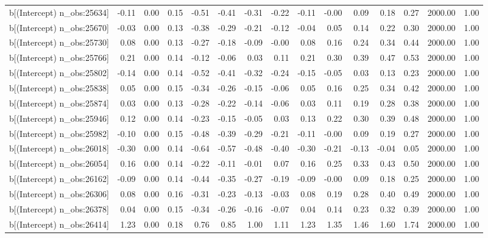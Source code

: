 \begin{table}[ht]
\begin{tabular}{rrrrrrrrrrrrrrr}
  b[(Intercept) n\_obs:25634] & -0.11 & 0.00 & 0.15 & -0.51 & -0.41 & -0.31 & -0.22 & -0.11 & -0.00 & 0.09 & 0.18 & 0.27 & 2000.00 & 1.00 \\ 
  b[(Intercept) n\_obs:25670] & -0.03 & 0.00 & 0.13 & -0.38 & -0.29 & -0.21 & -0.12 & -0.04 & 0.05 & 0.14 & 0.22 & 0.30 & 2000.00 & 1.00 \\ 
  b[(Intercept) n\_obs:25730] & 0.08 & 0.00 & 0.13 & -0.27 & -0.18 & -0.09 & -0.00 & 0.08 & 0.16 & 0.24 & 0.34 & 0.44 & 2000.00 & 1.00 \\ 
  b[(Intercept) n\_obs:25766] & 0.21 & 0.00 & 0.14 & -0.12 & -0.06 & 0.03 & 0.11 & 0.21 & 0.30 & 0.39 & 0.47 & 0.53 & 2000.00 & 1.00 \\ 
  b[(Intercept) n\_obs:25802] & -0.14 & 0.00 & 0.14 & -0.52 & -0.41 & -0.32 & -0.24 & -0.15 & -0.05 & 0.03 & 0.13 & 0.23 & 2000.00 & 1.00 \\ 
  b[(Intercept) n\_obs:25838] & 0.05 & 0.00 & 0.15 & -0.34 & -0.26 & -0.15 & -0.06 & 0.05 & 0.16 & 0.25 & 0.34 & 0.42 & 2000.00 & 1.00 \\ 
  b[(Intercept) n\_obs:25874] & 0.03 & 0.00 & 0.13 & -0.28 & -0.22 & -0.14 & -0.06 & 0.03 & 0.11 & 0.19 & 0.28 & 0.38 & 2000.00 & 1.00 \\ 
  b[(Intercept) n\_obs:25946] & 0.12 & 0.00 & 0.14 & -0.23 & -0.15 & -0.05 & 0.03 & 0.13 & 0.22 & 0.30 & 0.39 & 0.48 & 2000.00 & 1.00 \\ 
  b[(Intercept) n\_obs:25982] & -0.10 & 0.00 & 0.15 & -0.48 & -0.39 & -0.29 & -0.21 & -0.11 & -0.00 & 0.09 & 0.19 & 0.27 & 2000.00 & 1.00 \\ 
  b[(Intercept) n\_obs:26018] & -0.30 & 0.00 & 0.14 & -0.64 & -0.57 & -0.48 & -0.40 & -0.30 & -0.21 & -0.13 & -0.04 & 0.05 & 2000.00 & 1.00 \\ 
  b[(Intercept) n\_obs:26054] & 0.16 & 0.00 & 0.14 & -0.22 & -0.11 & -0.01 & 0.07 & 0.16 & 0.25 & 0.33 & 0.43 & 0.50 & 2000.00 & 1.00 \\ 
  b[(Intercept) n\_obs:26162] & -0.09 & 0.00 & 0.14 & -0.44 & -0.35 & -0.27 & -0.19 & -0.09 & -0.00 & 0.09 & 0.18 & 0.25 & 2000.00 & 1.00 \\ 
  b[(Intercept) n\_obs:26306] & 0.08 & 0.00 & 0.16 & -0.31 & -0.23 & -0.13 & -0.03 & 0.08 & 0.19 & 0.28 & 0.40 & 0.49 & 2000.00 & 1.00 \\ 
  b[(Intercept) n\_obs:26378] & 0.04 & 0.00 & 0.15 & -0.34 & -0.26 & -0.16 & -0.07 & 0.04 & 0.14 & 0.23 & 0.32 & 0.39 & 2000.00 & 1.00 \\ 
  b[(Intercept) n\_obs:26414] & 1.23 & 0.00 & 0.18 & 0.76 & 0.85 & 1.00 & 1.11 & 1.23 & 1.35 & 1.46 & 1.60 & 1.74 & 2000.00 & 1.00 \\ 

\end{tabular}
\end{table}
